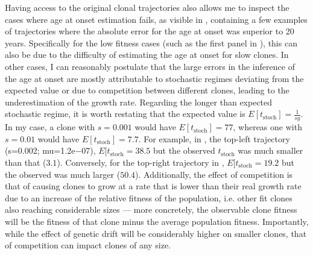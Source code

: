 \begin{figure}[!ht]
	\label{fig:age-at-onset-vs-true-fitness-sim}
\end{figure}

Having access to the original clonal trajectories also allows me to inspect the cases where age at onset estimation fails, as visible in , containing a few examples of trajectories where the absolute error for the age at onset was superior to 20 years. Specifically for the low fitness cases (such as the first panel in ), this can also be due to the difficulty of estimating the age at onset for slow clones. In other cases, I can reasonably postulate that the large errors in the inference of the age at onset are mostly attributable to stochastic regimes deviating from the expected value or due to competition between different clones, leading to the underestimation of the growth rate. Regarding the longer than expected stochastic regime, it is worth restating that the expected value is $E[t_{\mathrm{stoch}}] = \frac{1}{sg}$. In my case, a clone with $s=0.001$ would have $E[t_{\mathrm{stoch}}] = 77$, whereas one with $s=0.01$ would have $E[t_{\mathrm{stoch}}] = 7.7$. For example, in , the top-left trajectory (s=0.002; mu=1.2e−07), $E[t_{\mathrm{stoch}} = 38.5$ but the observed $t_{\mathrm{stoch}}$ was much smaller than that ($3.1$). Conversely, for the top-right trajectory in , $E[t_{\mathrm{stoch}} = 19.2$ but the observed was much larger ($50.4$). Additionally, the effect of competition is that of causing clones to grow at a rate that is lower than their real growth rate due to an increase of the relative fitness of the population, i.e. other fit clones also reaching considerable sizes --- more concretely, the observable clone fitness will be the fitness of that clone minus the average population fitness. Importantly, while the effect of genetic drift will be considerably higher on smaller clones, that of competition can impact clones of any size.

\begin{figure}[!ht]
	\label{fig:examples-bad-inference}
\end{figure}

